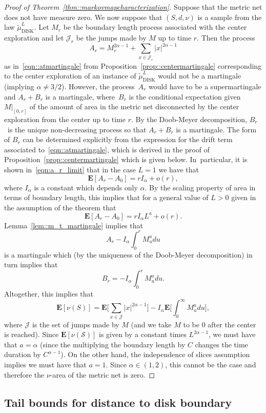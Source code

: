 \documentclass[10pt]{amsart}
\let\mathcal\mathscr
\theoremstyle{plain}
\numberwithin{theorem}{section}
\theoremstyle{definition}
\newcommand{\CS}{{\mathcal S}}
\newcommand{\CJ}{{\mathcal J}}
\newcommand \E {{\mathbf E}}
\newcommand{\tmudl}{\wt{\mu}_{\mathrm{DISK}}^L}
\let\wt\widetilde
\begin{document}
\begin{proof}[Proof of Theorem~\ref{thm::markovmapcharacterization}]
Suppose that the metric net does not have measure zero. We now suppose that $(S,d,\nu)$ is a sample from the law $\tmudl$. Let $M_r$ be the boundary length process associated with the center exploration and let $\CJ_r$ be the jumps made by $M$ up to time $r$. Then the process
\[
A_r = M_r^{2\alpha-1} + \sum_{x \in \CJ_r} |x|^{2\alpha-1}
\]
as in~\eqref{eqn::atmartingale} from Proposition~\ref{prop::centermartingale} corresponding to the center exploration of an instance of $\tmudl$ would not be a martingale (implying $\alpha \neq 3/2$). However, the process~$A_r$ would have to be a supermartingale and $A_r + B_r$ is a martingale, where~$B_r$ is the conditional expectation given $M|_{[0,r]}$ of the amount of area in the metric net disconnected by the center exploration from the center up to time $r$. By the Doob-Meyer decomposition, $B_r$~is the unique non-decreasing process so that $A_r + B_r$ is a martingale. The form of $B_r$ can be determined explicitly from the expression for the drift term associated to~\eqref{eqn::atmartingale}, which is derived in the proof of Proposition~\ref{prop::centermartingale} which is given below. In~particular, it is shown in~\eqref{eqn:a_r_limit} that in the case $L=1$ we have that
\[
\E[ A_r - A_0] = r I_\alpha + o(r),
\]
where $I_\alpha$ is a constant which depends only $\alpha$. By the scaling property of area in terms of boundary length, this implies that for a general value of $L > 0$ given in the assumption of the theorem that
\[
\E[ A_r - A_0] = r I_\alpha L^a + o(r).
\]
Lemma~\ref{lem::m_t_martingale} implies that
\[
A_r - I_\alpha \int_0^r M_u^a du
\]
is a martingale which (by the uniqueness of the Doob-Meyer decomposition) in turn implies that
\[
B_r = -I_\alpha \int_0^r M_u^a du.
\]
Altogether, this implies that
\[
\E[ \nu(S) ] = \E\biggl[ \sum_{x \in \CJ} |x|^{2\alpha-1} \biggr] - I_\alpha \E\biggl[ \int_0^\infty M_u^a du \biggr],
\]
where $\CJ$ is the set of jumps made by $M$ (and we take $M$ to be $0$ after the center is reached). Since $\E[ \nu(\CS) ]$ is given by a constant times $L^{2\alpha-1}$, we must have that $a = \alpha$ (since the multiplying the boundary length by $C$ changes the time duration by $C^{\alpha-1}$). On the other hand, the independence of slices assumption implies we must have that $a=1$. Since $\alpha \in (1,2)$, this cannot be the case and therefore the $\nu$-area of the metric net is zero.
\end{proof}

\subsection{Tail bounds for distance to disk boundary}
\label{subsec::tail_bounds}
\end{document}
